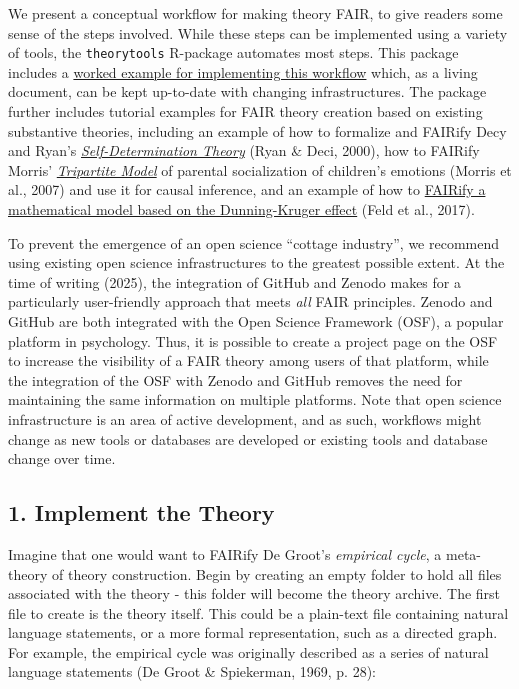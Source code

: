 \documentclass[man]{apa7}
\begin{document}
We present a conceptual workflow for making theory FAIR,
to give readers some sense of the steps involved.
While these steps can be implemented using a variety of tools,
the \texttt{theorytools} R-package automates most steps.
This package includes a \href{https://cjvanlissa.github.io/theorytools/articles/fair-theory.html}{worked example for implementing this workflow} which, as a living document,
can be kept up-to-date with changing infrastructures.
The package further includes tutorial examples for FAIR theory creation based on existing substantive theories, including
an example of how to formalize and FAIRify Decy and Ryan's \href{https://cjvanlissa.github.io/theorytools/articles/formalizing_sdt.html}{\emph{Self-Determination Theory}} (Ryan \& Deci, 2000),
how to FAIRify Morris' \href{https://cjvanlissa.github.io/theorytools/articles/causal-inference.html}{\emph{Tripartite Model}} of parental socialization of children's emotions (Morris et al., 2007) and use it for causal inference,
and an example of how to \href{https://cjvanlissa.github.io/theorytools/articles/dunning-kruger.html}{FAIRify a mathematical model based on the Dunning-Kruger effect} (Feld et al., 2017).

To prevent the emergence of an open science ``cottage industry'',
we recommend using existing open science infrastructures to the greatest possible extent.
At the time of writing (2025),
the integration of GitHub and Zenodo makes for a particularly user-friendly approach that meets \emph{all} FAIR principles.
Zenodo and GitHub are both integrated with the Open Science Framework (OSF),
a popular platform in psychology.
Thus, it is possible to create a project page on the OSF to increase the visibility of a FAIR theory among users of that platform,
while the integration of the OSF with Zenodo and GitHub removes the need for maintaining the same information on multiple platforms.
Note that open science infrastructure is an area of active development, and as such,
workflows might change as new tools or databases are developed or existing tools and database change over time.

\subsection{1. Implement the Theory}\label{implement-the-theory}

Imagine that one would want to FAIRify De Groot's \emph{empirical cycle},
a meta-theory of theory construction.
Begin by creating an empty folder to hold all files associated with the theory - this folder will become the theory archive.
The first file to create is the theory itself.
This could be a plain-text file containing natural language statements,
or a more formal representation, such as a directed graph.
For example, the empirical cycle was originally described as a series of natural language statements (De Groot \& Spiekerman, 1969, p. 28):
\end{document}
